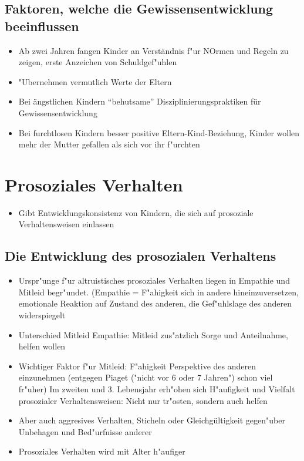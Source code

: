 \subsection{Faktoren, welche die Gewissensentwicklung beeinflussen}
\begin{itemize}
	\item
		Ab zwei Jahren fangen Kinder an Verständnis f"ur NOrmen und Regeln zu zeigen, erste Anzeichen von Schuldgef"uhlen
	\item
		"Ubernehmen vermutlich Werte der Eltern
	\item
		Bei ängstlichen Kindern \enquote{behutsame} Disziplinierungspraktiken für Gewissensentwicklung
	\item
		Bei furchtlosen Kindern besser positive Eltern-Kind-Beziehung, Kinder wollen mehr der Mutter gefallen als sich vor ihr f"urchten
\end{itemize}

\section{Prosoziales Verhalten}
\begin{itemize}
	\item
		Gibt Entwicklungskonsistenz von Kindern, die sich auf prosoziale Verhaltensweisen einlassen
\end{itemize}
\subsection{Die Entwicklung des prosozialen Verhaltens}
\begin{itemize}
	\item
		Urspr"unge f"ur altruistisches prosoziales Verhalten liegen in Empathie und Mitleid begr"undet. (Empathie = F"ahigkeit sich in andere hineinzuversetzen, emotionale Reaktion auf Zustand des anderen, die Gef"uhlslage des anderen widerspiegelt
	\item
		Unterschied Mitleid Empathie: Mitleid zus"atzlich Sorge und Anteilnahme, helfen wollen
	\item
		Wichtiger Faktor f"ur Mitleid: F"ahigkeit Perspektive des anderen einzunehmen (entgegen Piaget ("nicht vor 6 oder 7 Jahren") schon viel fr"uher)
		Im zweiten und 3. Lebensjahr erh"ohen sich H"aufigkeit und Vielfalt prosozialer Verhaltensweisen: Nicht nur tr"osten, sondern auch helfen
	\item
		Aber auch aggresives Verhalten, Sticheln oder Gleichgültigkeit gegen"uber Unbehagen und Bed"urfnisse anderer
	\item
		Prosoziales Verhalten wird mit Alter h"aufiger
\end{itemize}
